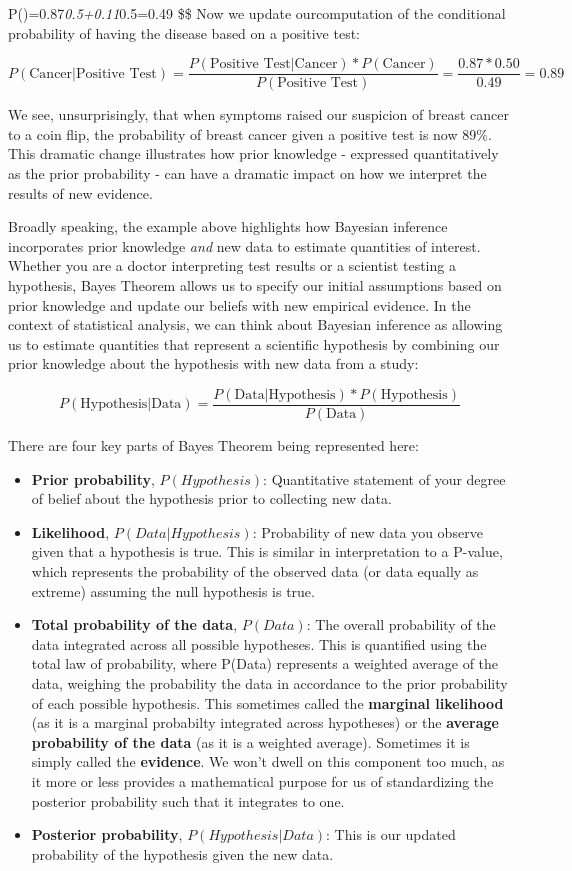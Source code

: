\documentclass[
]{book}
\providecommand{\tightlist}{%
  \setlength{\itemsep}{0pt}\setlength{\parskip}{0pt}}
\begin{document}
P()=0.87\emph{0.5+0.11}0.5=0.49
\$\$
Now we update ourcomputation of the conditional probability of having the disease based
on a positive test:

\[
P(\text{Cancer}|\text{Positive Test}) = \frac{P(\text{Positive Test|Cancer})*P(\text{Cancer})}{P(\text{Positive Test})}=\frac{0.87*0.50}{0.49}=0.89
\]

We see, unsurprisingly, that when symptoms raised our suspicion of
breast cancer to a coin flip, the probability of breast cancer given a
positive test is now 89\%. This dramatic change illustrates how prior
knowledge - expressed quantitatively as the prior probability - can have
a dramatic impact on how we interpret the results of new evidence.

Broadly speaking, the example above highlights how Bayesian inference
incorporates prior knowledge \emph{and} new data to estimate quantities of
interest. Whether you are a doctor interpreting test results or a
scientist testing a hypothesis, Bayes Theorem allows us to specify our
initial assumptions based on prior knowledge and update our beliefs with
new empirical evidence. In the context of statistical analysis, we can
think about Bayesian inference as allowing us to estimate quantities
that represent a scientific hypothesis by combining our prior knowledge
about the hypothesis with new data from a study:

\[
P(\text{Hypothesis}|\text{Data}) = \frac{P(\text{Data|Hypothesis})*P(\text{Hypothesis})}{P(\text{Data})}
\]

There are four key parts of Bayes Theorem being represented here:

\begin{itemize}
\tightlist
\item
  \textbf{Prior probability}, \(P(Hypothesis)\): Quantitative statement of your degree of belief about the hypothesis prior to collecting new data.
\item
  \textbf{Likelihood}, \(P(Data|Hypothesis)\): Probability of new data you observe given that a hypothesis is true. This is similar in interpretation to a P-value, which represents the probability of the observed data (or data equally as extreme) assuming the null hypothesis is true.
\item
  \textbf{Total probability of the data}, \(P(Data)\): The overall probability of the data integrated across all possible hypotheses. This is quantified using the total law of probability, where P(Data) represents a weighted average of the data, weighing the probability the data in accordance to the prior probability of each possible hypothesis. This sometimes called the \textbf{marginal likelihood} (as it is a marginal probabilty integrated across hypotheses) or the \textbf{average probability of the data} (as it is a weighted average). Sometimes it is simply called the \textbf{evidence}. We won't dwell on this component too much, as it more or less provides a mathematical purpose for us of standardizing the posterior probability such that it integrates to one.
\item
  \textbf{Posterior probability}, \(P(Hypothesis | Data)\): This is our updated probability of the hypothesis given the new data.
\end{itemize}
\end{document}

